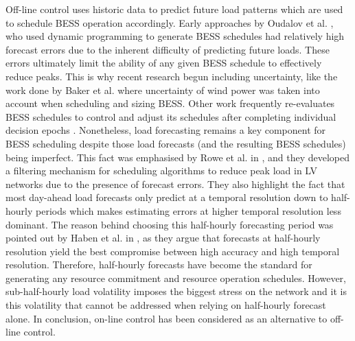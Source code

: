 Off-line control uses historic data to predict future load patterns which are used to schedule BESS operation accordingly.
Early approaches by Oudalov et al. \cite{Oudalov2007}, who used dynamic programming to generate BESS schedules had relatively high forecast errors due to the inherent difficulty of predicting future loads.
These errors ultimately limit the ability of any given BESS schedule to effectively reduce peaks.
This is why recent research begun including uncertainty, like the work done by Baker et al. \cite{Baker2017} where uncertainty of wind power was taken into account when scheduling and sizing BESS.
Other work frequently re-evaluates BESS schedules to control and adjust its schedules after completing individual decision epochs \cite{Wang2014a}.
Nonetheless, load forecasting remains a key component for BESS scheduling despite those load forecasts (and the resulting BESS schedules) being imperfect.
This fact was emphasised by Rowe et al. in \cite{Rowe2014a}, and they developed a filtering mechanism for scheduling algorithms to reduce peak load in LV networks due to the presence of forecast errors.
They also highlight the fact that most day-ahead load forecasts only predict at a temporal resolution down to half-hourly periods which makes estimating errors at higher temporal resolution less dominant.
The reason behind choosing this half-hourly forecasting period was pointed out by Haben et al. in \cite{Poghosyan2014, Haben2014}, as they argue that forecasts at half-hourly resolution yield the best compromise between high accuracy and high temporal resolution.
Therefore, half-hourly forecasts have become the standard for generating any resource commitment and resource operation schedules.
However, sub-half-hourly load volatility imposes the biggest stress on the network and it is this volatility that cannot be addressed when relying on half-hourly forecast alone.
In conclusion, on-line control has been considered as an alternative to off-line control.

